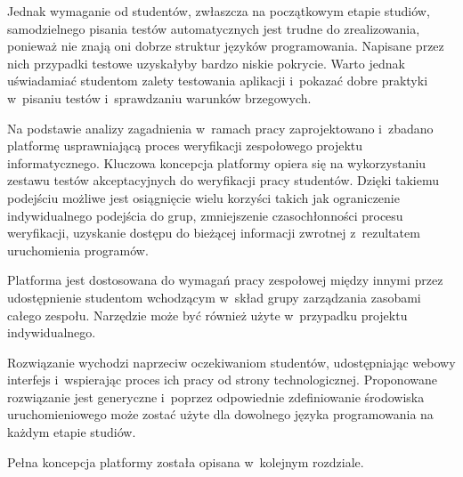 Jednak wymaganie od studentów, zwłaszcza na początkowym etapie studiów, samodzielnego pisania testów automatycznych jest trudne do zrealizowania, ponieważ nie znają oni dobrze struktur języków programowania.
Napisane przez nich przypadki testowe uzyskałyby bardzo niskie pokrycie.
Warto jednak uświadamiać studentom zalety testowania aplikacji i~pokazać dobre praktyki w~pisaniu testów i~sprawdzaniu warunków brzegowych.

Na podstawie analizy zagadnienia w~ramach pracy zaprojektowano i~zbadano platformę usprawniającą proces weryfikacji zespołowego projektu informatycznego.
Kluczowa koncepcja platformy opiera się na wykorzystaniu zestawu testów akceptacyjnych do weryfikacji pracy studentów.
Dzięki takiemu podejściu możliwe jest osiągnięcie wielu korzyści takich jak ograniczenie indywidualnego podejścia do grup, zmniejszenie czasochłonności procesu weryfikacji, uzyskanie dostępu do bieżącej informacji zwrotnej z~rezultatem uruchomienia programów.

Platforma jest dostosowana do wymagań pracy zespołowej między innymi przez udostępnienie studentom wchodzącym w~skład grupy zarządzania zasobami całego zespołu.
Narzędzie może być również użyte w~przypadku projektu indywidualnego.

Rozwiązanie wychodzi naprzeciw oczekiwaniom studentów, udostępniając webowy interfejs i~wspierając proces ich pracy od strony technologicznej.
Proponowane rozwiązanie jest generyczne i~poprzez odpowiednie zdefiniowanie środowiska uruchomieniowego może zostać użyte dla dowolnego języka programowania na każdym etapie studiów.


Pełna koncepcja platformy została opisana w~kolejnym rozdziale.




